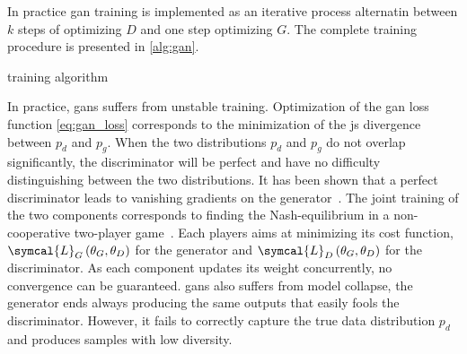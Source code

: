 \documentclass[../main.tex]{subfiles}
\begin{document}
		In practice \gls{gan} training is implemented as an iterative process alternatin between \(k\) steps of optimizing \(D\) and one step optimizing \(G\). 
		The complete training procedure is presented in \cref{alg:gan}. 
		\begin{algorithm}[htbp]
			\DontPrintSemicolon
			\caption{ training algorithm}\label{alg:gan}
		\end{algorithm}
		In practice, \glspl{gan} suffers from unstable training. 
		Optimization of the \gls{gan} loss function \cref{eq:gan_loss} corresponds to the minimization of the \gls{js} divergence between \(p_{d}\) and \(p_{g}\). 
		When the two distributions \(p_d\) and \(p_g\) do not overlap significantly, the discriminator will be perfect and have no difficulty distinguishing between the two distributions. 
		It has been shown that a perfect discriminator leads to vanishing gradients on the generator~\cite{Arjovsky2017TowardsPM}.
		The joint training of the two components corresponds to finding the Nash-equilibrium in a non-cooperative two-player game~\cite{Salimans2016ImprovedTF}. 
		Each players aims at minimizing its cost function, \(\symcal{L}_{G}\left(\theta_{G}, \theta_{D}\right)\) for the generator and \(\symcal{L}_{D}\left(\theta_{G}, \theta_{D}\right)\) for the discriminator. 
		As each component updates its weight concurrently, no convergence can be guaranteed.
		\Glspl{gan} also suffers from model collapse, the generator ends always producing the same outputs that easily fools the discriminator. 
		However, it fails to correctly capture the true data distribution \(p_{d}\) and produces samples with low diversity. 
\end{document}
